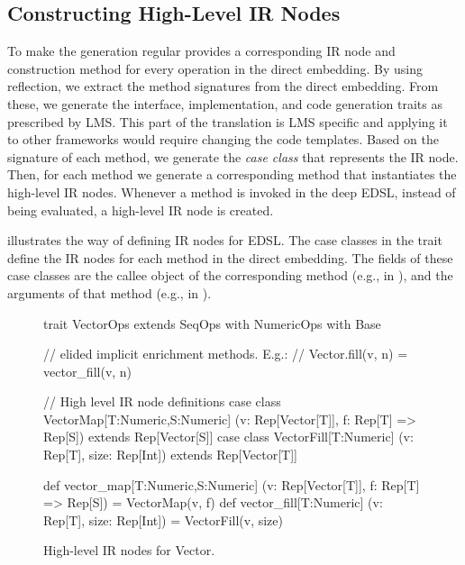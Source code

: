 
\subsection{Constructing High-Level IR Nodes}
\label{sec:yy-impl-def}

To make the generation regular \yy provides a corresponding IR node and
construction method for every operation in the direct embedding. By using
reflection, we extract the method signatures from the direct embedding. From
these, we generate the interface, implementation, and code generation traits as
prescribed by LMS. This part of the translation is LMS specific and applying it
to other frameworks would require changing the code templates. Based on the
signature of each method, we generate the \emph{case class} that represents the
IR node. Then, for each method we generate a corresponding method that
instantiates the high-level IR nodes. Whenever a method is invoked in the deep
EDSL, instead of being evaluated, a high-level IR node is created.

 illustrates the way of defining IR nodes for
 EDSL. The case classes in the  trait define the
IR nodes for each method in the direct embedding. The fields of these case
classes are the callee object of the corresponding method (e.g.,  in
), and the arguments of that method (e.g.,  in
).

\begin{figure}
\begin{listingtiny}
trait VectorOps extends SeqOps with
  NumericOps with Base {
  // elided implicit enrichment methods. E.g.:
  //   Vector.fill(v, n) = vector_fill(v, n)

  // High level IR node definitions
  case class VectorMap[T:Numeric,S:Numeric]
    (v: Rep[Vector[T]], f: Rep[T] => Rep[S])
    extends Rep[Vector[S]]
  case class VectorFill[T:Numeric]
    (v: Rep[T], size: Rep[Int])
    extends Rep[Vector[T]]

  def vector_map[T:Numeric,S:Numeric]
    (v: Rep[Vector[T]], f: Rep[T] => Rep[S]) =
      VectorMap(v, f)
  def vector_fill[T:Numeric]
    (v: Rep[T], size: Rep[Int]) =
    VectorFill(v, size)
}
\end{listingtiny}
\caption{\label{lst:vector_deep_ir} High-level IR nodes for Vector.}
\end{figure}


